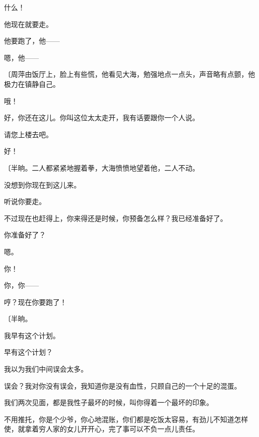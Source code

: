什么！

他现在就要走。

他要跑了，他——

嗯，他——

{\fangsong〔周萍由饭厅上，脸上有些慌，他看见大海，勉强地点一点头，声音略有点颤，他极力在镇静自己。}

哦！

好，你还在这儿。你叫这位太太走开，我有话要跟你一个人说。

请您上楼去吧。

好！

{\fangsong〔半晌。二人都紧紧地握着拳，大海愤愤地望着他，二人不动。}

没想到你现在到这儿来。

听说你要走。

不过现在也赶得上，你来得还是时候，你预备怎么样？我已经准备好了。

你准备好了？

嗯。

你！

你，你——

哼？现在你要跑了！

{\fangsong〔半晌。}

我早有这个计划。

早有这个计划？

我以为我们中间误会太多。

误会？我对你没有误会，我知道你是没有血性，只顾自己的一个十足的混蛋。

我们两次见面，都是我性子最坏的时候，叫你得着一个最坏的印象。

不用推托，你是个少爷，你心地混账，你们都是吃饭太容易，有劲儿不知道怎样使，就拿着穷人家的女儿开开心，完了事可以不负一点儿责任。

